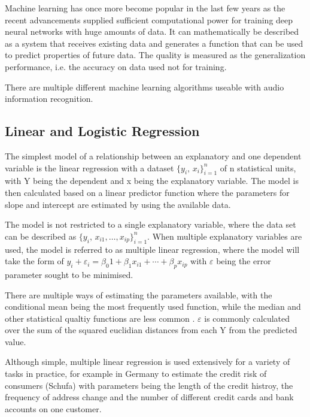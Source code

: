Machine learning has once more become popular in the last few years as the recent advancements supplied sufficient computational power for training deep neural networks with huge amounts of data.
It can mathematically be described as a system that receives existing data and generates a function that can be used to predict properties of future data.
The quality is measured as the generalization performance, i.e. the accuracy on data used not for training.


There are multiple different machine learning algorithms useable with audio information recognition.


\subsection{Linear and Logistic Regression}


 
The simplest model of a relationship between an explanatory and one dependent variable is the linear regression with a dataset ${\displaystyle \{y_{i},\,x_{i}\}_{i=1}^{n}}$ of n statistical units, with Y being the dependent and x being the explanatory variable.
The model is then calculated based on a linear predictor function where the parameters for slope and intercept are estimated by using the available data.
 
The model is not restricted to a single explanatory variable, where the data set can be described as  ${\displaystyle \{y_{i},\,x_{i1},\ldots ,x_{ip}\}_{i=1}^{n}}$. When multiple explanatory variables are used, the model is referred to as multiple linear regression, where the model will take the form of ${ y_{i} +\varepsilon _{i} =\beta _{0}1+\beta _{1}x_{i1}+\cdots +\beta _{p}x_{ip}}$ with $\varepsilon$ being the error parameter sought to be minimised.

There are multiple ways of estimating the parameters available, with the conditional mean being the most frequently used function, while the median and other statistical qualtiy functions are less common \cite{Yan:2009:LRA:1717831}.  $\varepsilon$ is commonly calculated over the sum of the squared euclidian distances from each Y from the predicted value.


Although simple, multiple linear regression is used extensively for a variety of tasks in practice, for example in Germany to estimate the credit risk of consumers (Schufa) with parameters being the length of the credit histroy, the frequency of address change and the number of different credit cards and bank accounts on one customer. %


